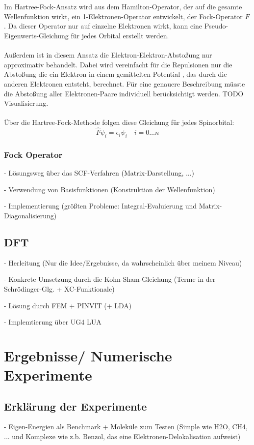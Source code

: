 \documentclass[a4paper, 12pt]{report}
\begin{document}
Im Hartree-Fock-Ansatz wird aus dem Hamilton-Operator, der auf die gesamte Wellenfunktion wirkt, 
ein 1-Elektronen-Operator entwickelt, der Fock-Operator $\hat{F}$.
Da dieser Operator nur auf einzelne Elektronen wirkt, 
kann eine Pseudo-Eigenwerts-Gleichung für jedes Orbital erstellt werden.
\\\\
Außerdem ist in diesem Ansatz die Elektron-Elektron-Abstoßung nur approximativ behandelt.
Dabei wird vereinfacht für die Repulsionen nur die Abstoßung die ein Elektron in einem gemittelten Potential
, das durch die anderen Elektronen entsteht, berechnet.
Für eine genauere Beschreibung müsste die Abstoßung aller Elektronen-Paare individuell berücksichtigt werden.
TODO Visualisierung.\\\\
Über die Hartree-Fock-Methode folgen diese Gleichung für jedes Spinorbital:
\begin{equation}
  \hat{F} \psi_i = \epsilon_i \psi_i \quad i = 0 \dots n
\end{equation}

\subsection{Fock Operator}


- Lösungsweg über das SCF-Verfahren (Matrix-Darstellung, ...)

- Verwendung von Basisfunktionen (Konstruktion der Wellenfunktion)

- Implementierung (größten Probleme: Integral-Evaluierung und
Matrix-Diagonalisierung)

\section{DFT}
- Herleitung (Nur die Idee/Ergebnisse, da wahrscheinlich über
meinem Niveau)

- Konkrete Umsetzung durch die Kohn-Sham-Gleichung (Terme in der
Schrödinger-Glg. + XC-Funktionale)

- Lösung durch FEM + PINVIT (+ LDA)

- Implemtierung über UG4 LUA

\chapter{Ergebnisse/ Numerische Experimente}
\section{Erklärung der Experimente}
- Eigen-Energien als Benchmark + Moleküle zum Testen (Simple wie
H2O, CH4, ... und Komplexe wie z.b. Benzol, das eine
Elektronen-Delokalisation aufweist)
\end{document}
